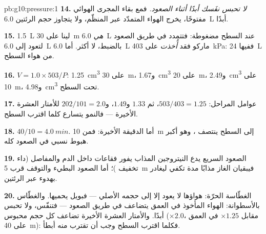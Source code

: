 \begin{solution}{pb:g10:pressure:1}
\textbf{14.} \emph{لا تحبس نفَسك أبدًا أثناء الصعود.} فمع بقاء
المجرى الهوائي مفتوحًا، يخرج الهواء المتمدّد عبر المنظّم، ولا
يتجاوز حجم الرئتين \qty{6.0}{L} أبدًا.

\textbf{15.} \qty{1.5}{L} لينا على \qty{30}{m} \emph{هي} \qty{6.0}{L}
عند السطح مضغوطة: فتتمدد في طريق الصعود لتعود إلى \qty{6.0}{L}
بالضبط، لا أكثر. أما \qty{6.0}{L} ماركو فقد \emph{أُخذت} على
\qty{403}{kPa}: ففيها \qty{24}{L} من هواء السطح.

\textbf{16.} $V = 1.0 \times 503/P$: \qty{1.25}{cm^3} على \qty{30}{m}،
و\qty{1.67}{cm^3} على \qty{20}{m}، و\qty{2.49}{cm^3} على \qty{10}{m}،
و\qty{4.98}{cm^3} تحت السطح.

\textbf{17.} عوامل المراحل: $503/403 = 1.25$، ثم $1.33$ و$1.49$،
و$202/101 = 2.0$ للأمتار العشرة الأخيرة --- فالنمو يتسارع كلما
اقترب السطح.

\textbf{18.} $40/10 = \qty{4.0}{min}$. أما الدقيقة الأخيرة: فمن
\qty{10}{m} إلى السطح ينتصف ، وهو أكبر
هبوط نسبي في الصعود كله.

\textbf{19.} الصعود السريع يدع النيتروجين المذاب يفور
فقاعات داخل الدم والمفاصل (داء تخفيف )؛ أما الصعود
البطيء والتوقف قرب \qty{5}{m} فيبقيان الغاز مذابًا مدة تكفي
ليغادر بهدوء عبر الرئتين.

\textbf{20.} الغطّاسة الحرّة: هواؤها لا يعود إلا إلى حجمه الأصلي
--- فبويل يحميها. والغطّاس بالأسطوانة: الهواء المأخوذ في العمق يتضاعف
في طريق الصعود --- فتنفّس، ولا تحبس أبدًا. والأمتار العشرة الأخيرة تضاعف
كل حجم محبوس ($\times 2.0$، مقابل $\times 1.25$ في العمق على
\qty{40}{m}): فكلما اقترب السطح وجب أن تقترب منه أبطأ.
\end{solution}
